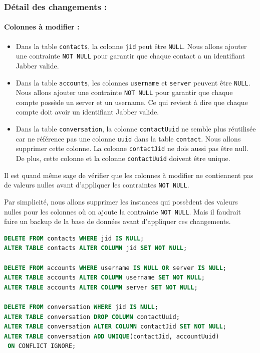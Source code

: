 \documentclass[a4paper,11pt]{article}
\begin{document}
\subsubsection*{Détail des changements :}

\paragraph{Colonnes à modifier :}
\begin{itemize}
	\item Dans la table \texttt{contacts}, la colonne \texttt{jid} peut être \texttt{NULL}. Nous allons ajouter une contrainte \texttt{NOT NULL} pour garantir que chaque contact a un identifiant Jabber valide.
	\item Dans la table \texttt{accounts}, les colonnes \texttt{username} et \texttt{server} peuvent être \texttt{NULL}. Nous allons ajouter une contrainte \texttt{NOT NULL} pour garantir que chaque compte possède un server et un username. Ce qui revient à dire que chaque compte doit avoir un identifiant Jabber valide.
	\item Dans la table \texttt{conversation}, la colonne \texttt{contactUuid} ne semble plus réutilisée car ne référence pas une colonne \texttt{uuid} dans la table \texttt{contact}. Nous allons supprimer cette colonne. La colonne \texttt{contactJid} ne dois aussi pas être null. De plus, cette colonne et la colonne \texttt{contactUuid} doivent être unique. 
\end{itemize}

Il est  quand même sage de vérifier que les colonnes à modifier ne contiennent pas de valeurs nulles avant d'appliquer les contraintes \texttt{NOT NULL}.

Par simplicité, nous allons supprimer les instances qui possèdent des valeurs nulles pour les colonnes où on ajoute la contrainte \texttt{NOT NULL}. Mais il faudrait faire un backup de la base de données avant d'appliquer ces changements.

\begin{lstlisting}[language=SQL]
DELETE FROM contacts WHERE jid IS NULL;
ALTER TABLE contacts ALTER COLUMN jid SET NOT NULL;

DELETE FROM accounts WHERE username IS NULL OR server IS NULL;
ALTER TABLE accounts ALTER COLUMN username SET NOT NULL;
ALTER TABLE accounts ALTER COLUMN server SET NOT NULL;

DELETE FROM conversation WHERE jid IS NULL;
ALTER TABLE conversation DROP COLUMN contactUuid;
ALTER TABLE conversation ALTER COLUMN contactJid SET NOT NULL;
ALTER TABLE conversation ADD UNIQUE(contactJid, accountUuid)
 ON CONFLICT IGNORE;
\end{lstlisting}
\end{document}
